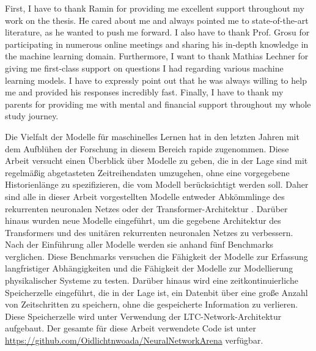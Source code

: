 \documentclass[draft,final]{vutinfth} %
\begin{document}
    \frontmatter %


    \AddStatementPage


    \begin{acknowledgements*}
        First, I have to thank Ramin for providing me excellent support throughout my work on the thesis.
        He cared about me and always pointed me to state-of-the-art literature, as he wanted to push me forward.
        I also have to thank Prof. Grosu for participating in numerous online meetings and sharing his in-depth knowledge in the machine learning domain.
        Furthermore, I want to thank Mathias Lechner for giving me first-class support on questions I had regarding various machine learning models.
        I have to expressly point out that he was always willing to help me and provided his responses incredibly fast.
        Finally, I have to thank my parents for providing me with mental and financial support throughout my whole study journey.
    \end{acknowledgements*}

    \begin{kurzfassung}
        Die Vielfalt der Modelle für maschinelles Lernen hat in den letzten Jahren mit dem Aufblühen der Forschung in diesem Bereich rapide zugenommen.
        Diese Arbeit versucht einen Überblick über Modelle zu geben, die in der Lage sind mit regelmäßig abgetasteten Zeitreihendaten umzugehen, ohne eine vorgegebene Historienlänge zu spezifizieren, die vom Modell berücksichtigt werden soll.
        Daher sind alle in dieser Arbeit vorgestellten Modelle entweder Abkömmlinge des rekurrenten neuronalen Netzes oder der Transformer-Architektur \cite{Transformer}.
        Darüber hinaus wurden neue Modelle eingeführt, um die gegebene Architektur des Transformers \cite{Transformer} und des unitären rekurrenten neuronalen Netzes \cite{EfficientUnitaryRNNs} zu verbessern.
        Nach der Einführung aller Modelle werden sie anhand fünf Benchmarks verglichen.
        Diese Benchmarks versuchen die Fähigkeit der Modelle zur Erfassung langfristiger Abhängigkeiten und die Fähigkeit der Modelle zur Modellierung physikalischer Systeme zu testen.
        Darüber hinaus wird eine zeitkontinuierliche Speicherzelle eingeführt, die in der Lage ist, ein Datenbit über eine große Anzahl von Zeitschritten zu speichern, ohne die gespeicherte Information zu verlieren.
        Diese Speicherzelle wird unter Verwendung der LTC-Network-Architektur \cite{LTCNetworks} aufgebaut.
        Der gesamte für diese Arbeit verwendete Code ist unter \url{https://github.com/Oidlichtnwoada/NeuralNetworkArena} verfügbar.
    \end{kurzfassung}
\end{document}
